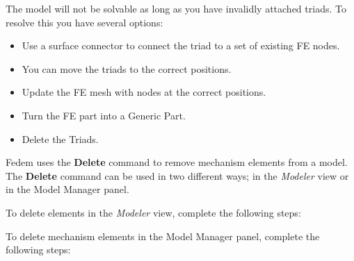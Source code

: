 The model will not be solvable as long as you have invalidly attached triads.
To resolve this you have several options:

\begin{itemize}
\item
  Use a surface connector to connect the triad to a set of existing FE nodes.
\item
  You can move the triads to the correct positions.
\item
  Update the FE mesh with nodes at the correct positions.
\item
  Turn the FE part into a Generic Part.
\item
  Delete the Triads.
\end{itemize}



Fedem uses the \textbf{Delete} command to remove mechanism elements from
a model. The \textbf{Delete} command can be used in two different ways;
in the {\sl Modeler} view or in the Model Manager panel.



To delete elements in the {\sl Modeler} view, complete the following steps:

\vskip14mm




To delete mechanism elements in the Model Manager panel,
complete the following steps:

